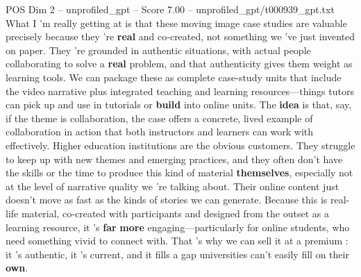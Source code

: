 \begin{textsample}{POS Dim 2 – unprofiled\_gpt – Score 7.00 – unprofiled\_gpt/t000939\_gpt.txt}  \label{ex:f2_pos_029}
What I ’m really getting at is that these moving image case studies are valuable precisely because they ’re \textbf{real} and co‑created, not something we ’ve just invented on paper.
They ’re grounded in authentic situations, with actual people collaborating to solve a \textbf{real} problem, and that authenticity gives them weight as learning tools.
We can package these as complete case-study units that include the video narrative plus integrated teaching and learning resources—things tutors can pick up and use in tutorials or \textbf{build} into online units.
The \textbf{idea} is that, say, if the theme is collaboration, the case offers a concrete, lived example of collaboration in action that both instructors and learners can work with effectively.
Higher education institutions are the obvious customers.
They struggle to keep up with new themes and emerging practices, and they often don't have the skills or the time to produce this kind of material \textbf{themselves}, especially not at the level of narrative quality we ’re talking about.
Their online content just doesn't move as fast as the kinds of stories we can generate.
Because this is real-life material, co-created with participants and designed from the outset as a learning resource, it ’s \textbf{far} \textbf{more} engaging—particularly for online students, who need something vivid to connect with.
That ’s why we can sell it at a premium : it ’s authentic, it ’s current, and it fills a gap universities can't easily fill on their \textbf{own}.

\end{textsample}
